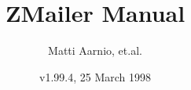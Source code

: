 \documentclass[twoside,a4paper]{article}
\begin{document}
\startdocument

\title{ZMailer Manual}
\author{Matti Aarnio, et.al.}
\date{v1.99.4, 25 March 1998}

\maketitle
\cleardoublepage


%
\end{document}
